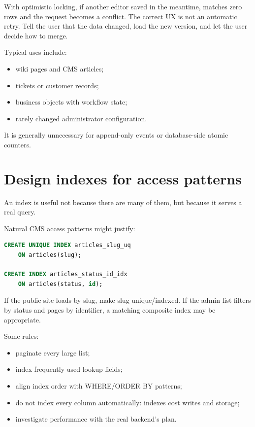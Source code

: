 With optimistic locking, if another editor saved in the meantime,  matches zero rows and the request becomes a conflict. The correct UX is not an automatic retry. Tell the user that the data changed, load the new version, and let the user decide how to merge.

Typical uses include:

\begin{itemize}
\item wiki pages and CMS articles;
\item tickets or customer records;
\item business objects with workflow state;
\item rarely changed administrator configuration.
\end{itemize}

It is generally unnecessary for append-only events or database-side atomic counters.

\section{Design indexes for access patterns}

An index is useful not because there are many of them, but because it serves a real query.

Natural CMS access patterns might justify:

\begin{lstlisting}[language=SQL]
CREATE UNIQUE INDEX articles_slug_uq
    ON articles(slug);

CREATE INDEX articles_status_id_idx
    ON articles(status, id);
\end{lstlisting}

If the public site loads by slug, make slug unique/indexed. If the admin list filters by status and pages by identifier, a matching composite index may be appropriate.

Some rules:

\begin{itemize}
\item paginate every large list;
\item index frequently used lookup fields;
\item align index order with WHERE/ORDER BY patterns;
\item do not index every column automatically: indexes cost writes and storage;
\item investigate performance with the real backend's  plan.
\end{itemize}

